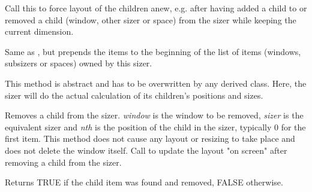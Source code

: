 
Call this to force layout of the children anew, e.g. after having added a child
to or removed a child (window, other sizer or space) from the sizer while keeping
the current dimension.

\label{wxsizerprepend}




Same as , but prepends the items to the beginning of the
list of items (windows, subsizers or spaces) owned by this sizer.

\label{wxsizerrecalcsizes}


This method is abstract and has to be overwritten by any derived class.
Here, the sizer will do the actual calculation of its children's positions
and sizes.

\label{wxsizerremove}




Removes a child from the sizer. {\it window} is the window to be removed, {\it sizer} is the
equivalent sizer and {\it nth} is the position of the child in the sizer, typically 0 for
the first item. This method does not cause any layout or resizing to take place and does
not delete the window itself. Call  to update
the layout "on screen" after removing a child from the sizer.

Returns TRUE if the child item was found and removed, FALSE otherwise.

\label{wxsizersetdimension}

